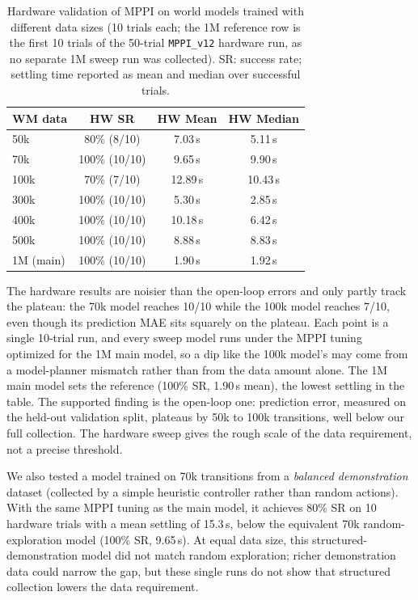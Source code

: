 \begin{table}[!t]
\centering
\caption{Hardware validation of MPPI on world models trained with
different data sizes (10 trials each; the 1M reference row is the first
10 trials of the 50-trial \texttt{MPPI\_v12} hardware run, as no separate
1M sweep run was collected). SR: success rate;
settling time reported as mean and median over successful trials.}
\label{tab:wm_data_sweep_hw}
\begin{tabular}{lccc}
\toprule
\textbf{WM data} & \textbf{HW SR} & \textbf{HW Mean} & \textbf{HW Median} \\
\midrule
50k            & 80\% (8/10)  & 7.03\,s  & 5.11\,s \\
70k            & 100\% (10/10) & 9.65\,s  & 9.90\,s \\
100k           & 70\% (7/10)  & 12.89\,s & 10.43\,s \\
300k           & 100\% (10/10) & 5.30\,s  & 2.85\,s \\
400k           & 100\% (10/10) & 10.18\,s & 6.42\,s \\
500k           & 100\% (10/10) & 8.88\,s  & 8.83\,s \\
1M (main)      & 100\% (10/10) & 1.90\,s  & 1.92\,s \\
\bottomrule
\end{tabular}
\end{table}

The hardware results are noisier than the open-loop errors and only
partly track the plateau: the 70k model reaches 10/10 while the 100k
model reaches 7/10, even though its prediction MAE sits squarely on the
plateau. Each point is a single 10-trial run, and every sweep model runs
under the MPPI tuning optimized for the 1M main model, so a dip like the
100k model's may come from a model-planner mismatch rather than from the
data amount alone. The 1M main model sets the reference (100\% SR,
1.90\,s mean), the lowest settling in the table. The supported finding is
the open-loop one: prediction error, measured on the held-out validation
split, plateaus by 50k to 100k transitions, well below our full
collection. The hardware sweep gives the rough scale of the data
requirement, not a precise threshold.

We also tested a model trained on 70k transitions from a
\emph{balanced demonstration} dataset (collected by a simple heuristic
controller rather than random actions). With the same MPPI tuning as the
main model, it achieves 80\% SR on 10 hardware trials with a mean
settling of 15.3\,s, below the equivalent 70k random-exploration
model (100\% SR, 9.65\,s). At equal data size, this structured-demonstration
model did not match random exploration; richer demonstration data could
narrow the gap, but these single runs do not show that structured collection
lowers the data requirement.


